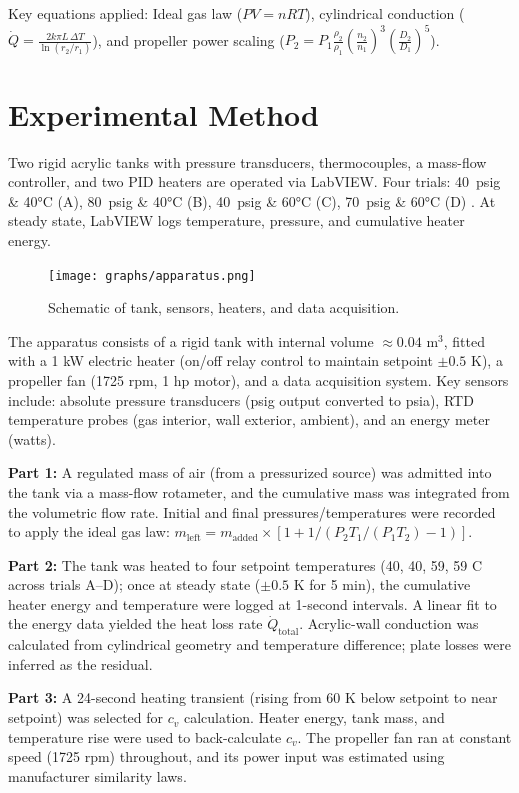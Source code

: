 \documentclass[12pt]{article}
\begin{document}
Key equations applied: Ideal gas law ($PV=nRT$), cylindrical conduction ($\dot{Q}=\frac{2k\pi L\,\Delta T}{\ln(r_2/r_1)}$), and propeller power scaling ($P_2 = P_1 \frac{\rho_2}{\rho_1} \left(\frac{n_2}{n_1}\right)^3 \left(\frac{D_2}{D_1}\right)^5$).

\section*{Experimental Method}
Two rigid acrylic tanks with pressure transducers, thermocouples, a mass-flow controller, and two PID heaters are operated via LabVIEW. Four trials: 40~psig \& 40\si{\celsius} (A), 80~psig \& 40\si{\celsius} (B), 40~psig \& 60\si{\celsius} (C), 70~psig \& 60\si{\celsius} (D) \cite{che260_manual}. At steady state, LabVIEW logs temperature, pressure, and cumulative heater energy.

\begin{figure}[H]
    \centering
    \texttt{[image: graphs/apparatus.png]}
    \caption{Schematic of tank, sensors, heaters, and data acquisition.}
    \label{fig:apparatus}
\end{figure}

The apparatus consists of a rigid tank with internal volume $\approx 0.04$ m$^3$, fitted with a 1 kW electric heater (on/off relay control to maintain setpoint $\pm 0.5$ K), a propeller fan (1725 rpm, 1 hp motor), and a data acquisition system. Key sensors include: absolute pressure transducers (psig output converted to psia), RTD temperature probes (gas interior, wall exterior, ambient), and an energy meter (watts). 

\textbf{Part 1:} A regulated mass of air (from a pressurized source) was admitted into the tank via a mass-flow rotameter, and the cumulative mass was integrated from the volumetric flow rate. Initial and final pressures/temperatures were recorded to apply the ideal gas law: $m_{\text{left}} = m_{\text{added}} \times [1 + 1/(P_2 T_1 / (P_1 T_2) - 1)]$.

\textbf{Part 2:} The tank was heated to four setpoint temperatures (40, 40, 59, 59 \textdegree C across trials A–D); once at steady state ($\pm 0.5$ K for 5 min), the cumulative heater energy and temperature were logged at 1-second intervals. A linear fit to the energy data yielded the heat loss rate $\dot{Q}_{\text{total}}$. Acrylic-wall conduction was calculated from cylindrical geometry and temperature difference; plate losses were inferred as the residual.

\textbf{Part 3:} A 24-second heating transient (rising from 60 K below setpoint to near setpoint) was selected for $c_v$ calculation. Heater energy, tank mass, and temperature rise were used to back-calculate $c_v$. The propeller fan ran at constant speed (1725 rpm) throughout, and its power input was estimated using manufacturer similarity laws.
\end{document}
